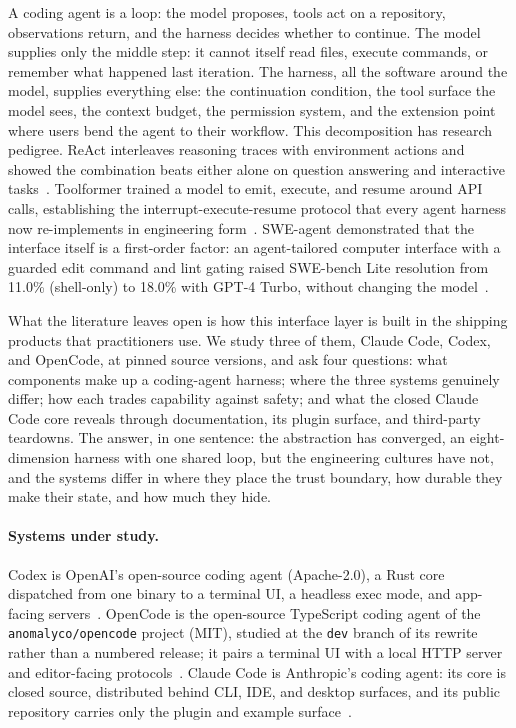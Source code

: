 \documentclass{article}
\newcommand{\codex}[0]{Codex}
\newcommand{\occ}[0]{OpenCode}
\newcommand{\ccc}[0]{Claude Code}
\begin{document}
A coding agent is a loop: the model proposes, tools act on a repository,
observations return, and the harness decides whether to continue. The
model supplies only the middle step: it cannot itself read files, execute
commands, or remember what happened last iteration. The harness, all the
software around the model, supplies everything else: the continuation
condition, the tool surface the model sees, the context budget, the
permission system, and the extension point where users bend the agent to
their workflow. This decomposition has research pedigree. ReAct interleaves reasoning traces
with environment actions and showed the combination beats either alone on
question answering and interactive tasks~\citep{yao2023react}. Toolformer
trained a model to emit, execute, and resume around API calls,
establishing the interrupt-execute-resume protocol that every agent harness
now re-implements in engineering form~\citep{schick2023toolformer}. SWE-agent
demonstrated that the interface itself is a first-order factor: an
agent-tailored computer interface with a guarded edit command and lint
gating raised SWE-bench Lite resolution from 11.0\% (shell-only) to 18.0\%
with GPT-4 Turbo, without changing the model~\citep{yang2024sweagent}.

What the literature leaves open is how this interface layer is built in
the shipping products that practitioners use. We study three of
them, \ccc{}, \codex{}, and \occ{}, at pinned source versions, and ask four
questions: what components make up a coding-agent harness; where the
three systems genuinely differ; how each trades capability against safety;
and what the closed \ccc{} core reveals through documentation, its plugin
surface, and third-party teardowns. The answer, in one sentence: the
abstraction has converged, an eight-dimension harness with one shared
loop, but the engineering cultures have not, and the systems differ in
where they place the trust boundary, how durable they make their state,
and how much they hide.

\paragraph{Systems under study.} \codex{} is OpenAI's open-source coding
agent (Apache-2.0), a Rust core dispatched from one binary to a terminal
UI, a headless exec mode, and app-facing
servers~\citep{codexRepo}. \occ{} is the open-source
TypeScript coding agent of the \texttt{anomalyco/opencode} project (MIT),
studied at the \texttt{dev} branch of its rewrite rather than a numbered
release; it pairs a terminal UI with a local HTTP server and editor-facing
protocols~\citep{opencodeRepo}. \ccc{} is Anthropic's
coding agent: its core is closed source, distributed behind CLI, IDE, and
desktop surfaces, and its public repository carries only the plugin and
example surface~\citep{claudeCodeSurface,claudeCodePermissionsDocs}.
\end{document}
